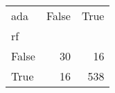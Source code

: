 \begin{tabular}{lrr}
\toprule
ada &  False &  True  \\
rf    &        &        \\
\midrule
False &     30 &     16 \\
True  &     16 &    538 \\
\bottomrule
\end{tabular}
